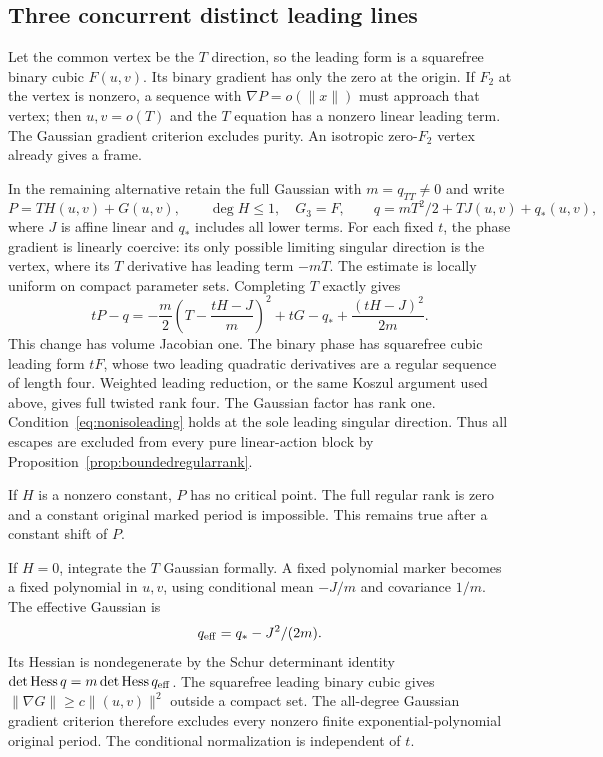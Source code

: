 \subsection{Three concurrent distinct leading lines}
\label{sec:concurrentregular}

Let the common vertex be the $T$ direction, so the leading form
is a squarefree binary cubic $F(u,v)$. Its binary gradient has
only the zero at the origin. If $F_2$ at the vertex is nonzero,
a sequence with $\nabla P=o(\|x\|)$ must approach that vertex;
then $u,v=o(T)$ and the $T$ equation has a nonzero linear
leading term. The Gaussian gradient criterion excludes purity.
An isotropic zero-$F_2$ vertex already gives a frame.

In the remaining alternative retain the full Gaussian with
$m=q_{TT}\ne0$ and write
\[
 P=T H(u,v)+G(u,v),\qquad\deg H\le1,\quad G_3=F,
 \qquad q=mT^2/2+T J(u,v)+q_*(u,v),
\]
where $J$ is affine linear and $q_*$ includes all lower terms.
For each fixed $t$, the phase gradient is linearly coercive:
its only possible limiting singular direction is the vertex,
where its $T$ derivative has leading term $-mT$. The estimate
is locally uniform on compact parameter sets. Completing $T$
exactly gives
\[
 tP-q=-\frac m2\left(T-\frac{tH-J}{m}\right)^2
                    +tG-q_*+\frac{(tH-J)^2}{2m}.
\]
This change has volume Jacobian one. The binary phase has
squarefree cubic leading form $tF$, whose two leading quadratic
derivatives are a regular sequence of length four. Weighted
leading reduction, or the same Koszul argument used above,
gives full twisted rank four. The Gaussian factor has rank one.
Condition~\eqref{eq:nonisoleading} holds at the sole leading
singular direction. Thus all escapes are excluded from every
pure linear-action block by Proposition~\ref{prop:boundedregularrank}.

If $H$ is a nonzero constant, $P$ has no critical point.
The full regular rank is zero and a constant original marked
period is impossible. This remains true after a constant shift
of $P$.

If $H=0$, integrate the $T$ Gaussian formally. A fixed polynomial
marker becomes a fixed polynomial in $u,v$, using conditional
mean $-J/m$ and covariance $1/m$. The effective Gaussian is
\[
 q_{\rm eff}=q_*-J^2/(2m).
\]
Its Hessian is nondegenerate by the Schur determinant identity
$\det\operatorname{Hess}q=m\det\operatorname{Hess}q_{\rm eff}$.
The squarefree leading binary cubic gives
$\|\nabla G\|\ge c\|(u,v)\|^2$ outside a compact set.
The all-degree Gaussian gradient criterion therefore excludes
every nonzero finite exponential-polynomial original period.
The conditional normalization is independent of $t$.

